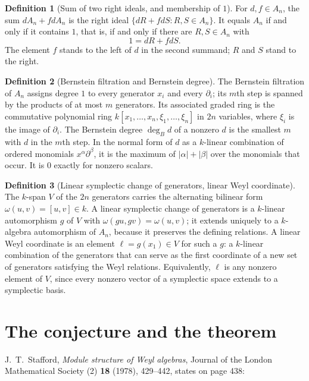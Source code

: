 \documentclass[11pt,a4paper]{article}
\theoremstyle{definition}
\newtheorem{definition}{Definition}
\theoremstyle{plain}
\begin{document}
\begin{definition}[Sum of two right ideals, and membership of $1$]
For $d,f\in A_n$, the sum $dA_n+fdA_n$ is the right ideal
$\{dR+fdS : R,S\in A_n\}$. It equals $A_n$ if and only if it contains $1$,
that is, if and only if there are $R,S\in A_n$ with
\[
  1=dR+fdS .
\]
The element $f$ stands to the left of $d$ in the second summand; $R$ and $S$
stand to the right.
\end{definition}

\begin{definition}[Bernstein filtration and Bernstein degree]
The Bernstein filtration of $A_n$ assigns degree $1$ to every generator $x_i$
and every $\partial_i$; its $m$th step is spanned by the products of at most
$m$ generators. Its associated graded ring is the commutative polynomial ring
$k[x_1,\dots,x_n,\xi_1,\dots,\xi_n]$ in $2n$ variables, where $\xi_i$ is the
image of $\partial_i$. The Bernstein degree $\deg_B d$ of a nonzero $d$ is the
smallest $m$ with $d$ in the $m$th step. In the normal form of $d$ as a
$k$-linear combination of ordered monomials $x^\alpha\partial^\beta$, it is the
maximum of $|\alpha|+|\beta|$ over the monomials that occur. It is $0$ exactly
for nonzero scalars.
\end{definition}

\begin{definition}[Linear symplectic change of generators, linear Weyl coordinate]
The $k$-span $V$ of the $2n$ generators carries the alternating bilinear form
$\omega(u,v)=[u,v]\in k$. A linear symplectic change of generators is a
$k$-linear automorphism $g$ of $V$ with $\omega(gu,gv)=\omega(u,v)$; it extends
uniquely to a $k$-algebra automorphism of $A_n$, because it preserves the
defining relations. A linear Weyl coordinate is an element
$\ell=g(x_1)\in V$ for such a $g$: a $k$-linear combination of the generators
that can serve as the first coordinate of a new set of generators satisfying
the Weyl relations. Equivalently, $\ell$ is any nonzero element of $V$, since
every nonzero vector of a symplectic space extends to a symplectic basis.
\end{definition}

\section{The conjecture and the theorem}

J.\ T.\ Stafford, \emph{Module structure of Weyl algebras}, Journal of the
London Mathematical Society (2) \textbf{18} (1978), 429--442, states on
page 438:
\end{document}
